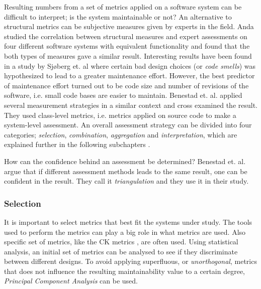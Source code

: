 Resulting numbers from a set of metrics applied on a software system can be
difficult to interpret; is the system maintainable or not? An alternative to
structural metrics can be subjective measures given by experts in the field.
Anda \cite{anda2007assessing} studied the correlation between structural
measures and expert assessments on four different software systems with
equivalent functionality and found that the both types of measures gave a
similar result. Interesting results have been found in a study by Sjøberg et.
al \cite{sjoberg2013quantifying} where certain bad design choices (or
\textit{code smells}) was hypothesized to lead to a greater maintenance effort.
However, the best predictor of maintenance effort turned out to be code size
and number of revisions of the software, i.e. small code bases are easier to
maintain. Benestad et. al. \cite{benestad2006assessing} applied several
measurement strategies in a similar context and cross examined the result. They
used class-level metrics, i.e. metrics applied on source code to make a
system-level assessment. An overall assessment strategy can be divided into
four categories; \textit{selection}, \textit{combination}, \textit{aggregation}
and \textit{interpretation}, which are explained further in the following
subchapters \cite{benestad2006assessing}.

How can the confidence behind an assessment be determined? Benestad et. al.
argue that if different assessment methods leads to the same result, one can be
confident in the result. They call it \textit{triangulation} and they use it in
their study. \cite{benestad2006assessing}

\subsubsection{Selection}

It is important to select metrics that best fit the systems under study. The
tools used to perform the metrics can play a big role in what metrics are used.
Also specific set of metrics, like the CK metrics \cite{chidamber1994metrics},
are often used. Using statistical analysis, an initial set of metrics can be
analysed to see if they discriminate between different designs. To avoid
applying superfluous, or \textit{unorthogonal}, metrics that does not influence
the resulting maintainability value to a certain degree, \textit{Principal
Component Analysis} can be used. \cite{benestad2006assessing}


